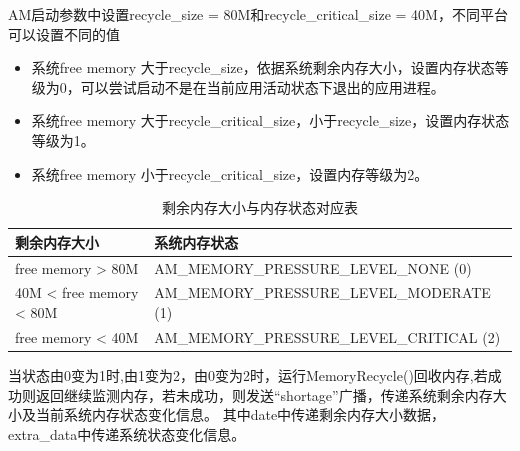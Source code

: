 AM启动参数中设置recycle\_size = 80M和recycle\_critical\_size = 40M，不同平台可以设置不同的值\par
\begin{itemize}
  \item 系统free memory 大于recycle\_size，依据系统剩余内存大小，设置内存状态等级为0，可以尝试启动不是在当前应用活动状态下退出的应用进程。
  \item 系统free memory 大于recycle\_critical\_size，小于recycle\_size，设置内存状态等级为1。
  \item 系统free memory 小于recycle\_critical\_size，设置内存等级为2。
\end{itemize}
\begin{table}[!htbp]
  \begin{center}
  \caption{剩余内存大小与内存状态对应表}
  \label{biao}
  \begin{tabular}{|l|l|}      
  \hline                     
  剩余内存大小 & 系统内存状态\\
  \hline        
  free memory > 80M & AM\_MEMORY\_PRESSURE\_LEVEL\_NONE (0) \\  \hline 
  40M < free memory < 80M & AM\_MEMORY\_PRESSURE\_LEVEL\_MODERATE (1) \\  \hline 
  free memory < 40M & AM\_MEMORY\_PRESSURE\_LEVEL\_CRITICAL (2) \\
  \hline
  \end{tabular}
  \end{center}
  \end{table}
\par 当状态由0变为1时,由1变为2，由0变为2时，运行MemoryRecycle()回收内存,若成功则返回继续监测内存，若未成功，则发送“shortage”广播，传递系统剩余内存大小及当前系统内存状态变化信息。
其中date中传递剩余内存大小数据，extra\_data中传递系统状态变化信息。
